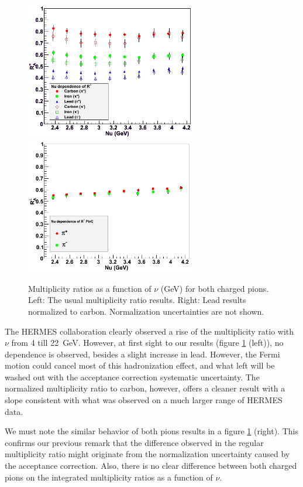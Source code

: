 \begin{figure}[tbp]
\centering
\includegraphics[width=7.4cm] {chap6-fig/F_RvNu.png} 
\includegraphics[width=7.4cm] {chap6-fig/F_RvNu_PbC.png} 
\caption{Multiplicity ratios as a function of $\nu$ (GeV) for both charged pions. Left: The usual multiplicity ratio results. Right: Lead results normalized to carbon. Normalization uncertainties are not shown.}
\label{fig:RNu}
\end{figure}

The HERMES collaboration clearly observed a rise of the multiplicity ratio with $\nu$ from 4 till 22~GeV. However, at first sight to our results (figure \ref{fig:RNu} (left)), no dependence is observed, besides a slight increase in lead.
However, the Fermi motion could cancel most of this hadronization effect, and what left will be washed out with the acceptance correction systematic uncertainty. The normalized multiplicity ratio to carbon, however, offers a cleaner result with a slope consistent with what was observed on a much larger range of HERMES data.

We must note the similar behavior of both pions results in a figure 
\ref{fig:RNu} (right). This confirms our previous remark that the difference 
observed in the regular multiplicity ratio might originate from the 
normalization uncertainty caused by the acceptance correction. Also, there is no 
clear difference between both charged pions on the integrated multiplicity 
ratios as a function of $\nu$.

